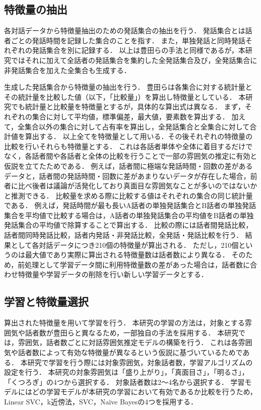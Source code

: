 \subsection{特徴量の抽出}

各対話データから特徴量抽出のための発話集合の抽出を行う．
発話集合とは話者ごとの発話時間を記録した集合のことを指す．
また，単独発話と同時発話それぞれの発話集合を別に記録する．
以上は豊田らの手法と同様であるが，本研究ではそれに加えて全話者の発話集合を集約した全発話集合及び，全発話集合に非発話集合を加えた全集合も生成する．

生成した発話集合から特徴量の抽出を行う．
豊田らは各集合に対する統計量とその統計量を比較した値（以下，「比較量」）を算出し特徴量としている．
本研究でも統計量と比較量を特徴量とするが，具体的な算出式は異なる．
まず，それぞれの集合に対して平均値，標準偏差，最大値，要素数を算出する．
加えて，全集合以外の集合に対して占有率を算出し，全発話集合と全集合に対して合計値を算出する．
以上全てを特徴量として用いる．その後それぞれの特徴量の比較を行いそれらも特徴量とする．
これは各話者単体や全体に着目するだけでなく，各話者間や各話者と全体の比較を行うことで一部の雰囲気の推定に有効と仮説を立てたためである．
例えば，話者間に極端な発話時間・回数の差があるデータと，話者間の発話時間・回数に差があまりないデータが存在した場合，前者に比べ後者は議論が活発化しており真面目な雰囲気なことが多いのではないかと推測できる．
比較量を求める際に比較する値はそれぞれの集合の同じ統計量である．
例えば，発話時間が最も長いA話者の単独発話集合とB話者の単独発話集合を平均値で比較する場合は，A話者の単独発話集合の平均値をB話者の単独発話集合の平均値で除算することで算出する．
比較の際には話者間発話比較，話者間同時発話比較，話者内発話・非発話比較，全発話・発話比較を行う．
結果として各対話データにつき210個の特徴量が算出される．
ただし，210個というのは最大値であり実際に算出される特徴量数は話者数により異なる．
そのため，前処理として学習データ間に利用特徴量数の差があった場合は，話者数に合わせ特徴量や学習データの削除を行い新しい学習データとする．

\subsection{学習と特徴量選択}

算出された特徴量を用いて学習を行う．
本研究の学習の方法は，対象とする雰囲気や話者数が豊田らと異なるため，一部独自の手法を採用する．
本研究では，雰囲気，話者数ごとに対話雰囲気推定モデルの構築を行う．
これは各雰囲気や話者数によって有効な特徴量が異なるという仮説に基づいているためである．
本研究で学習を行う際には対象雰囲気，対象話者数，学習アルゴリズムの設定を行う．
本研究の対象雰囲気は「盛り上がり」，「真面目さ」，「明るさ」，「くつろぎ」の4つから選択する．
対象話者数は2〜4名から選択する．
学習モデルにはどの学習モデルが本研究の学習において有効であるか比較を行うため，Linear SVC，k近傍法，SVC，Naïve Bayesの4つを採用する．


